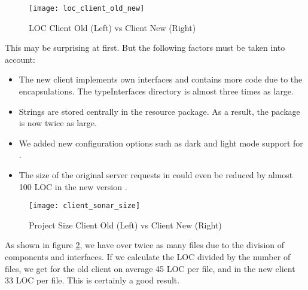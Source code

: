 \begin{figure}[H]
    \centering
    \texttt{[image: loc\_client\_old\_new]}
    \caption{LOC Client Old (Left) vs Client New (Right)}
    \label{fig:loc_client_old_new}
\end{figure}

This may be surprising at first. But the following factors must be taken into account:

\begin{itemize}
    \item The new client implements own interfaces and contains more code due to the encapsulations.
    The typeInterfaces directory is almost three times as large.
    \item Strings are stored centrally in the resource package.
    As a result, the package is now twice as large.
    \item We added new configuration options such as dark and light mode support for .
    \item The size of the original server requests in 
    could even be reduced by almost 100 LOC in the new version .
\end{itemize}

\begin{figure}[H]
    \centering
    \texttt{[image: client\_sonar\_size]}
    \caption{Project Size Client Old (Left) vs Client New (Right)}
    \label{fig:client_sonar_size}
\end{figure}

As shown in figure \ref{fig:client_sonar_size},
we have over twice as many files due to the division of components and interfaces.
If we calculate the LOC divided by the number of files,
we get for the old client on average 45 LOC per file, and in the new client 33 LOC per file.
This is certainly a good result.
